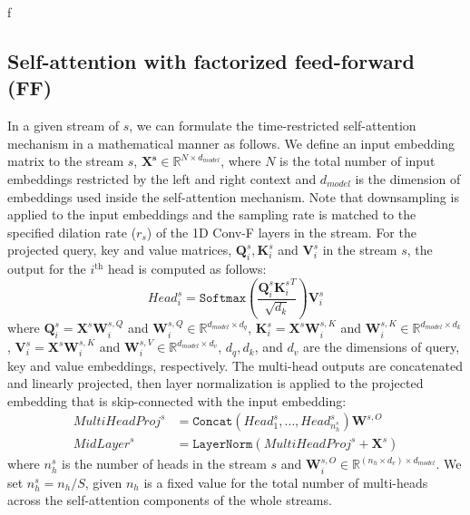 f\documentclass{article}
\begin{document}
\subsection{Self-attention with factorized feed-forward (FF)}
In a given stream of $s$, we can formulate the time-restricted self-attention mechanism \cite{povey18} in a mathematical manner as follows. We define an input embedding matrix to the stream $s$, $\bm{X^s} \in \mathbb{R}^{N \times d_{model}}$, where $N$ is the total number of input embeddings restricted by the left and right context and $d_{model}$ is the dimension of embeddings used inside the self-attention mechanism. Note that downsampling is applied to the input embeddings and the sampling rate is matched to the specified dilation rate ($r_s$) of the 1D Conv-F layers in the stream. For the projected query, key and value matrices, $\bm{Q}_i^s, \bm{K}_i^s$ and $\bm{V}_i^s$ in the stream $s$, the output for the $i^{\textrm{th}}$ head is computed as follows:
\begin{equation}
 \textit{Head}_{i}^s  = \texttt{Softmax} \left( \frac{\bm{Q}_i^s {\bm{K}_{i}^s}^T}{\sqrt{d_k}} \right) \bm{V}_i^s
\end{equation}
where $\bm{Q}_i^s = \bm{X}^s \bm{W}_i^{s,Q}$ and $\bm{W}_i^{s,Q} \in \mathbb{R}^{d_{model} \times d_q}$, $\bm{K}_i^s = \bm{X}^s \bm{W}_i^{s,K} $ and $\bm{W}_i^{s,K} \in \mathbb{R}^{d_{model} \times d_k}$, $\bm{V}_i^s = \bm{X}^s \bm{W}_i^{s,K}$ and $\bm{W}_i^{s,V} \in \mathbb{R}^{d_{model} \times d_v}$, $d_q, d_k$, and $d_v$ are the dimensions of query, key and value embeddings, respectively. The multi-head outputs are concatenated and linearly projected, then layer normalization is applied to the projected embedding that is skip-connected with the input embedding:
\begin{align}
    \textit{MultiHeadProj}^s &= \texttt{Concat} \left( \textit{Head}_1^s, \dots, \textit{Head}_{n_h^s}^s \right) \bm{W}^{s,O} \\
  \textit{MidLayer}^s &= \texttt{LayerNorm} \left( \textit{MultiHeadProj}^s +  \bm{X}^s \right)
\end{align}
where $n_h^s$ is the number of heads in the stream $s$ and $\bm{W}_i^{s,O} \in \mathbb{R}^{\left( n_h \times d_v \right)  \times d_{model}}$. We set $n_h^s = n_h / S$, given $n_h$ is a fixed value for the total number of multi-heads across the self-attention components of the whole streams.
\end{document}
